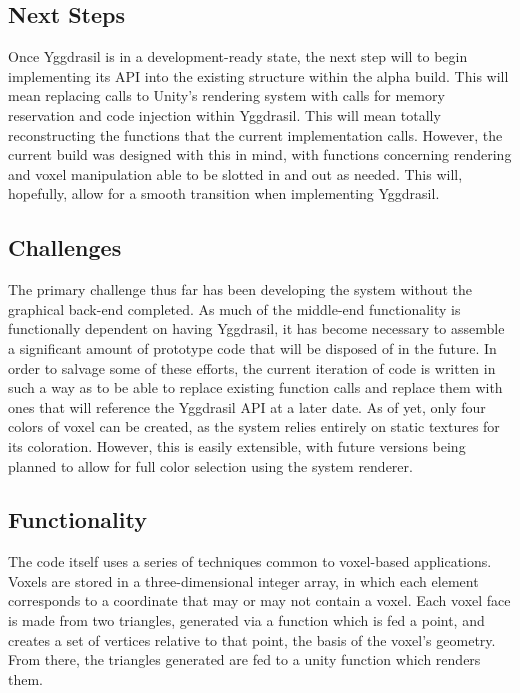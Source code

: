 \documentclass[onecolumn, draftclsnofoot,10pt, compsoc]{IEEEtran}
\begin{document}
\subsection{Next Steps}
Once Yggdrasil is in a development-ready state, the next step will to begin implementing its API into the existing structure within the alpha build. This will mean replacing calls to Unity’s rendering system with calls for memory reservation and code injection within Yggdrasil. This will mean totally reconstructing the functions that the current implementation calls. However, the current build was designed with this in mind, with functions concerning rendering and voxel manipulation able to be slotted in and out as needed. This will, hopefully, allow for a smooth transition when implementing Yggdrasil.

\subsection{Challenges}
The primary challenge thus far has been developing the system without the graphical back-end completed. As much of the middle-end functionality is functionally dependent on having Yggdrasil, it has become necessary to assemble a significant amount of prototype code that will be disposed of in the future. In order to salvage some of these efforts, the current iteration of code is written in such a way as to be able to replace existing function calls and replace them with ones that will reference the Yggdrasil API at a later date. As of yet, only four colors of voxel can be created, as the system relies entirely on static textures for its coloration. However, this is easily extensible, with future versions being planned to allow for full color selection using the system renderer. 

\subsection{Functionality}
The code itself uses a series of techniques common to voxel-based applications. Voxels are stored in a three-dimensional integer array, in which each element corresponds to a coordinate that may or may not contain a voxel. Each voxel face is made from two triangles, generated via a function which is fed a point, and creates a set of vertices relative to that point, the basis of the voxel’s geometry. From there, the triangles generated are fed to a unity function which renders them.
\end{document}
